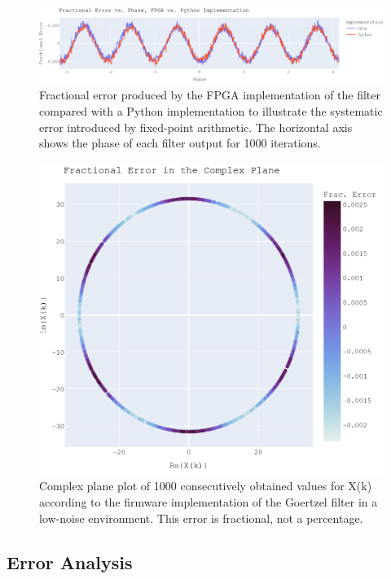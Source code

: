\documentclass[reprint,amsmath,amssymb]{revtex4-2}
\begin{document}
\begin{figure}
    \centering
    \includegraphics[width=\linewidth]{figs/pythonvfpga.png}
    \caption{Fractional error produced by the FPGA implementation of the filter compared with a Python implementation to illustrate the systematic error introduced by fixed-point arithmetic. The horizontal axis shows the phase of each filter output for 1000 iterations.}
    \label{fig:18}
\end{figure}

\begin{figure}
    \centering
    \includegraphics[width=\linewidth]{figs/error_complex.png}
    \caption{Complex plane plot of 1000 consecutively obtained values for X(k) according to the firmware implementation of the Goertzel filter in a low-noise environment. This error is fractional, not a percentage.}
    \label{fig:19}
\end{figure}

\subsection{Error Analysis}
\end{document}
